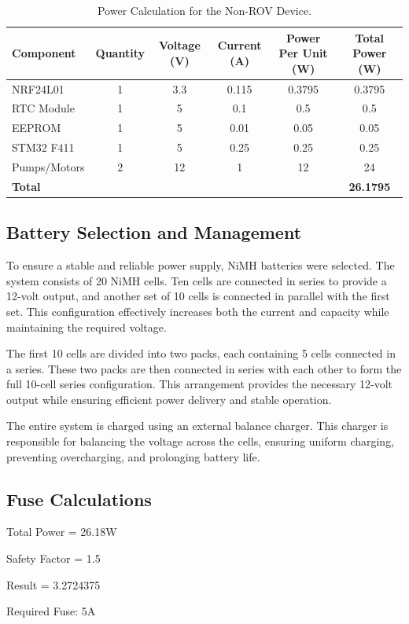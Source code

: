 \documentclass[11pt, twocolumn]{article}
\begin{document}
\begin{table}[b]
  \centering
  \begin{adjustbox}{max width=0.75\textwidth}
  \begin{tabular}{@{} l *{5}{c} @{}}
    \toprule
    \textbf{Component} & \textbf{Quantity} & \textbf{Voltage (V)} & \textbf{Current (A)} & \textbf{Power Per Unit (W)} & \textbf{Total Power (W)} \\
    \midrule
    NRF24L01            & 1 & 3.3   & 0.115     & 0.3795    & 0.3795   \\
    RTC Module                & 1 & 5   & 0.1   & 0.5    & 0.5   \\
    EEPROM           & 1 & 5    & 0.01      & 0.05     & 0.05     \\
    STM32 F411           & 1 & 5   & 0.25      & 0.25     & 0.25   \\
    Pumps/Motors	& 2	& 12	& 1	& 12	& 24 \\
    \midrule
   \multicolumn{5}{l}{\textbf{Total}} & \textbf{26.1795} \\
    \bottomrule
  \end{tabular}
  \end{adjustbox}
\caption{Power Calculation for the Non-ROV Device.}
\label{tab:power_calculation}
\end{table}

\subsection{Battery Selection and Management}

To ensure a stable and reliable power supply, NiMH batteries were selected. The system consists of 20 NiMH cells. Ten cells are connected in series to provide a 12-volt output, and another set of 10 cells is connected in parallel with the first set. This configuration effectively increases both the current and capacity while maintaining the required voltage.

\hspace{10pt} The first 10 cells are divided into two packs, each containing 5 cells connected in a series. These two packs are then connected in series with each other to form the full 10-cell series configuration. This arrangement provides the necessary 12-volt output while ensuring efficient power delivery and stable operation.

\hspace{10pt} The entire system is charged using an external balance charger. This charger is responsible for balancing the voltage across the cells, ensuring uniform charging, preventing overcharging, and prolonging battery life.

\subsection{Fuse Calculations}

Total Power = 26.18W

Safety Factor = 1.5

Result = 3.2724375

Required Fuse: 5A
\end{document}
